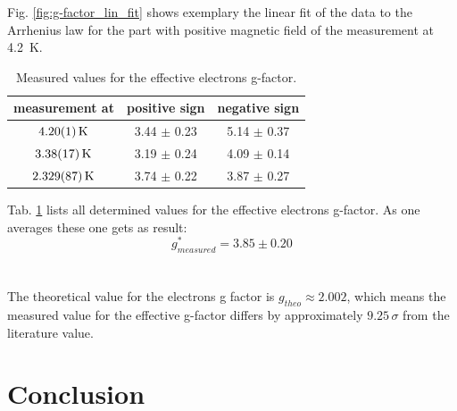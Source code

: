 \documentclass[12pt,a4paper]{article}
\begin{document}
Fig. \ref{fig:g-factor_lin_fit} shows exemplary the linear fit of the data to the Arrhenius law for the part with positive magnetic field of the measurement at \SI{4.2}{K}.

\begin{table} [H]
\centering
\begin{tabular}{|c|c|c|}
\hline 
measurement at & positive sign & negative sign \\ 
\hline 
$\SI{4.2 \pm 0.01}{K}$ & 3.44 $\pm$ 0.23 & 5.14 $\pm$ 0.37 \\ 
\hline 
$\SI{3.38 \pm 0.17}{K}$ & 3.19 $\pm$ 0.24 & 4.09 $\pm$ 0.14 \\ 
\hline 
$\SI{2.329 \pm 0.087}{K}$ & 3.74 $\pm$ 0.22 & 3.87 $\pm$ 0.27 \\ 
\hline 
\end{tabular} 
\caption{Measured values for the effective electrons g-factor.}
\label{tab:electron_g_factor}
\end{table}

Tab. \ref{tab:electron_g_factor} lists all determined values for the effective electrons g-factor. As one averages these one gets as result:
\begin{equation*}
g^*_{measured} = 3.85 \pm 0.20
\end{equation*}\\
\\
The theoretical value for the electrons g factor is $g_{theo} \approx 2.002$, which means the measured value for the effective g-factor differs by approximately $9.25 \, \sigma$ from the literature value. 



\section{Conclusion}
\end{document}
